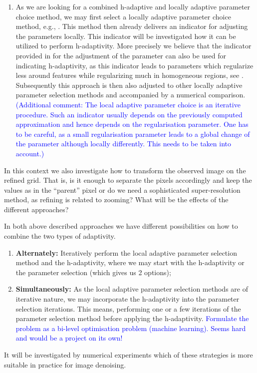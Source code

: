 \documentclass[enabledeprecatedfontcommands,cleardoublepage=empty,headsepline,twoside,11pt,DIV=15,BCOR=12mm,final]{scrartcl}
\begin{document}
\begin{enumerate}
\item As we are looking for a combined h-adaptive and locally adaptive parameter choice method, we may first select a locally adaptive parameter choice method, e.g., \cite{DonHinRin}. This method then already delivers an indicator for adjusting the parameters locally. This indicator will be investigated how it can be utilized to perform h-adaptivity. More precisely we believe that the indicator provided in \cite{DonHinRin} for the adjustment of the parameter can also be used for indicating h-adaptivity, as this indicator leads to parameters which regularize less around features while regularizing much in homogeneous regions, see \cite{DonHinRin}. Subsequently this approach is then also adjusted to other locally adaptive parameter selection methods and accompanied by a numerical comparison.\\
\textcolor{blue}{(Additional comment: The local adaptive parameter choice is an iterative procedure. Such an indicator usually depends on the previously computed approximation and hence depends on the regularisation parameter. One has to be careful, as a small regularisation parameter leads to a global change of the parameter although locally differently. This needs to be taken into account.)}
\end{enumerate}  

In this context we also investigate how to transform the observed image on the refined grid. That is, is it enough to separate the pixels accordingly and keep the values as in the ``parent'' pixel or do we need a sophisticated super-resolution method, as refining is related to zooming? What will be the effects of the different approaches?

In both above described approaches we have different possibilities on how to combine the two types of adaptivity. 
\begin{enumerate}
\item \textbf{Alternately:} Iteratively perform the local adaptive parameter selection method  and the h-adaptivity, where we may start with the h-adaptivity or the parameter selection (which gives us 2 options);
\item \textbf{Simultaneously:} As the local adaptive parameter selection methods are of iterative nature, we may incorporate the h-adaptivity into the parameter selection iterations. This means, performing one or a few iterations of the parameter selection method before applying the h-adaptivity.  \textcolor{blue}{Formulate the problem as a bi-level optimisation problem (machine learning). Seems hard and would be a project on its own!}
\end{enumerate}
It will be investigated by numerical experiments which of these strategies is more suitable in practice for image denoising.
\end{document}
